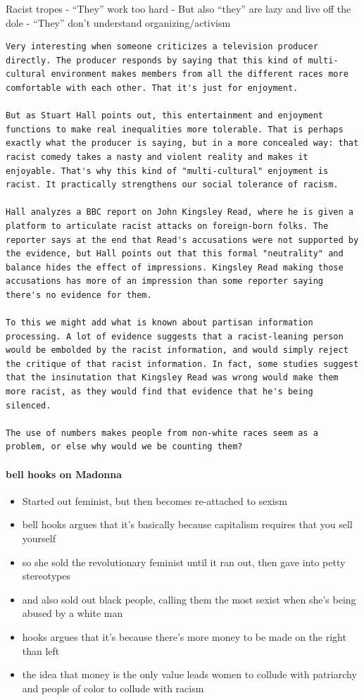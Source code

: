 \documentclass[12pt,book]{article}
\begin{document}
Racist tropes - ``They'' work too hard - But also ``they'' are lazy and
live off the dole - ``They'' don't understand organizing/activism

\begin{verbatim}
Very interesting when someone criticizes a television producer directly. The producer responds by saying that this kind of multi-cultural environment makes members from all the different races more comfortable with each other. That it's just for enjoyment.

But as Stuart Hall points out, this entertainment and enjoyment functions to make real inequalities more tolerable. That is perhaps exactly what the producer is saying, but in a more concealed way: that racist comedy takes a nasty and violent reality and makes it enjoyable. That's why this kind of "multi-cultural" enjoyment is racist. It practically strengthens our social tolerance of racism.

Hall analyzes a BBC report on John Kingsley Read, where he is given a platform to articulate racist attacks on foreign-born folks. The reporter says at the end that Read's accusations were not supported by the evidence, but Hall points out that this formal "neutrality" and balance hides the effect of impressions. Kingsley Read making those accusations has more of an impression than some reporter saying there's no evidence for them.

To this we might add what is known about partisan information processing. A lot of evidence suggests that a racist-leaning person would be embolded by the racist information, and would simply reject the critique of that racist information. In fact, some studies suggest that the insinutation that Kingsley Read was wrong would make them more racist, as they would find that evidence that he's being silenced.

The use of numbers makes people from non-white races seem as a problem, or else why would we be counting them?
\end{verbatim}

\paragraph{bell hooks on Madonna}\label{bell-hooks-on-madonna}

\begin{itemize}
\itemsep1pt\parskip0pt
\item
  Started out feminist, but then becomes re-attached to sexism
\item
  bell hooks argues that it's basically because capitalism requires that
  you sell yourself
\item
  so she sold the revolutionary feminist until it ran out, then gave
  into petty stereotypes
\item
  and also sold out black people, calling them the most sexist when
  she's being abused by a white man
\item
  hooks argues that it's because there's more money to be made on the
  right than left
\item
  the idea that money is the only value leads women to collude with
  patriarchy and people of color to collude with racism
\end{itemize}
\end{document}
